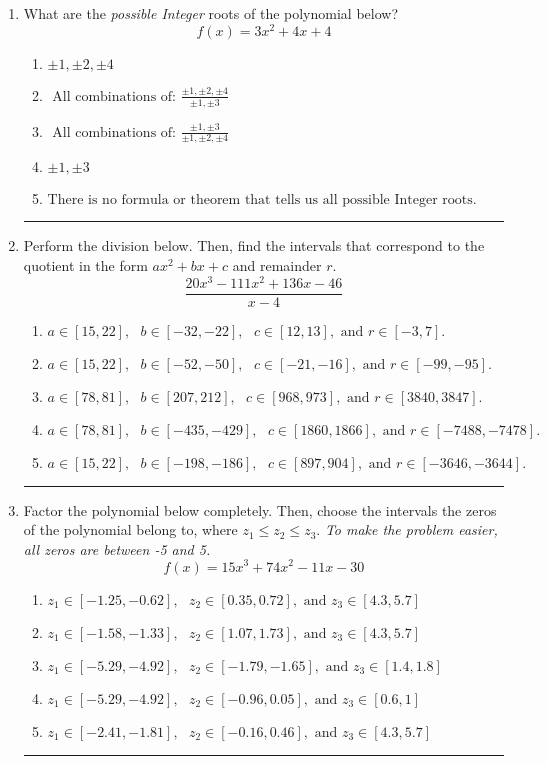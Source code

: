 \documentclass[14pt]{extbook}
\newcommand{\litem}[1]{\item#1\hspace*{-1cm}\rule{\textwidth}{0.4pt}}
\begin{document}
\begin{enumerate}
\litem{
What are the \textit{possible Integer} roots of the polynomial below?\[ f(x) = 3x^{2} +4 x + 4 \]\begin{enumerate}[label=\Alph*.]
\item \( \pm 1,\pm 2,\pm 4 \)
\item \( \text{ All combinations of: }\frac{\pm 1,\pm 2,\pm 4}{\pm 1,\pm 3} \)
\item \( \text{ All combinations of: }\frac{\pm 1,\pm 3}{\pm 1,\pm 2,\pm 4} \)
\item \( \pm 1,\pm 3 \)
\item \( \text{There is no formula or theorem that tells us all possible Integer roots.} \)

\end{enumerate} }
\litem{
Perform the division below. Then, find the intervals that correspond to the quotient in the form $ax^2+bx+c$ and remainder $r$.\[ \frac{20x^{3} -111 x^{2} +136 x -46}{x -4} \]\begin{enumerate}[label=\Alph*.]
\item \( a \in [15, 22], \text{   } b \in [-32, -22], \text{   } c \in [12, 13], \text{   and   } r \in [-3, 7]. \)
\item \( a \in [15, 22], \text{   } b \in [-52, -50], \text{   } c \in [-21, -16], \text{   and   } r \in [-99, -95]. \)
\item \( a \in [78, 81], \text{   } b \in [207, 212], \text{   } c \in [968, 973], \text{   and   } r \in [3840, 3847]. \)
\item \( a \in [78, 81], \text{   } b \in [-435, -429], \text{   } c \in [1860, 1866], \text{   and   } r \in [-7488, -7478]. \)
\item \( a \in [15, 22], \text{   } b \in [-198, -186], \text{   } c \in [897, 904], \text{   and   } r \in [-3646, -3644]. \)

\end{enumerate} }
\litem{
Factor the polynomial below completely. Then, choose the intervals the zeros of the polynomial belong to, where $z_1 \leq z_2 \leq z_3$. \textit{To make the problem easier, all zeros are between -5 and 5.}\[ f(x) = 15x^{3} +74 x^{2} -11 x -30 \]\begin{enumerate}[label=\Alph*.]
\item \( z_1 \in [-1.25, -0.62], \text{   }  z_2 \in [0.35, 0.72], \text{   and   } z_3 \in [4.3, 5.7] \)
\item \( z_1 \in [-1.58, -1.33], \text{   }  z_2 \in [1.07, 1.73], \text{   and   } z_3 \in [4.3, 5.7] \)
\item \( z_1 \in [-5.29, -4.92], \text{   }  z_2 \in [-1.79, -1.65], \text{   and   } z_3 \in [1.4, 1.8] \)
\item \( z_1 \in [-5.29, -4.92], \text{   }  z_2 \in [-0.96, 0.05], \text{   and   } z_3 \in [0.6, 1] \)
\item \( z_1 \in [-2.41, -1.81], \text{   }  z_2 \in [-0.16, 0.46], \text{   and   } z_3 \in [4.3, 5.7] \)


\end{enumerate}}
\end{enumerate}
\end{document}
